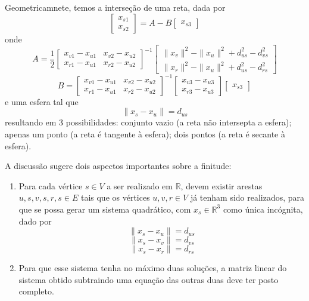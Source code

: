 \documentclass[a4paper,12pt]{article}
\begin{document}
	Geometricamnete, temos a interseção de uma reta, dada por
	$$
	\begin{bmatrix}
	x_{s1}\\
	x_{s2}
	\end{bmatrix} =
	A -
	B
	\begin{bmatrix}
	x_{s3}
	\end{bmatrix}
	$$
	onde
	$$
	A = \frac{1}{2} \begin{bmatrix}
	x_{v1} - x_{u1} & x_{v2} - x_{u2}\\
	x_{r1} - x_{u1} & x_{r2} - x_{u2}
	\end{bmatrix}^{-1} 
	\begin{bmatrix}
	\|x_{v}\|^{2} - \|x_{u}\|^{2} + d_{us}^{2} - d_{vs}^{2}\\
	\|x_{r}\|^{2} - \|x_{u}\|^{2} + d_{us}^{2} - d_{rs}^{2}
	\end{bmatrix} 
	$$
	$$
	B = \begin{bmatrix}
	x_{v1} - x_{u1} & x_{v2} - x_{u2}\\
	x_{r1} - x_{u1} & x_{r2} - x_{u2}
	\end{bmatrix}^{-1}
	\begin{bmatrix}
	x_{v3} - x_{u3}\\
	x_{r3} - x_{u3}
	\end{bmatrix}
	\begin{bmatrix}
	x_{s3}
	\end{bmatrix}
	$$
	e uma esfera tal que
	$$
	\|x_{s} - x_{u}\|= d_{us}
	$$
	resultando em 3 possibilidades: conjunto vazio (a reta não intersepta a esfera); apenas um ponto (a reta é tangente à esfera); dois pontos (a reta é secante à esfera).
	
	A discussão sugere dois aspectos importantes sobre a finitude:
	
	\begin{enumerate}
		\item Para cada vértice $s\in V$ a ser realizado em $\mathbb{R}$, devem existir arestas ${u, s}, {v, s}, {r, s} \in E$ tais que os vértices $u, v, r \in V$ já tenham sido realizados, para que se possa gerar um sistema quadrático, com $x_{s} \in\mathbb{R}^{3}$ como única incógnita, dado por
		$$
		\|x_{s} - x_{u}\|= d_{us}
		$$
		$$
		\|x_{s} - x_{v}\|= d_{vs}
		$$
		$$
		\|x_{s} - x_{r}\|= d_{rs}
		$$
		\item Para que esse sistema tenha no máximo duas soluções, a matriz linear do sistema obtido subtraindo uma equação das outras duas deve ter posto completo.
	\end{enumerate}
	
\end{document}
